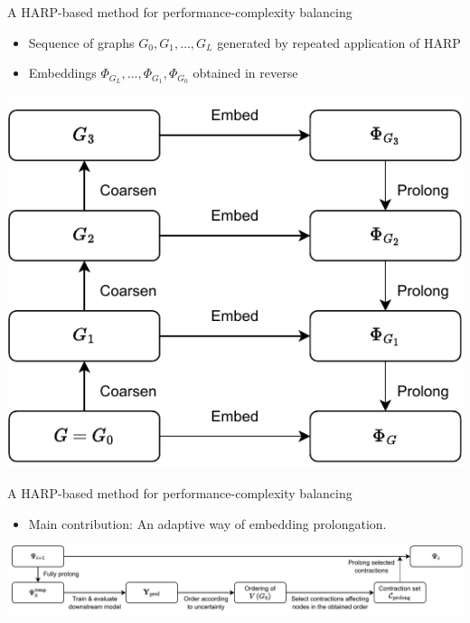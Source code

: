 \documentclass[10pt]{beamer}
\begin{document}
\begin{frame}{A HARP-based method for performance-complexity balancing}
	\begin{itemize}
		\item Sequence of graphs \( G_0, G_1, \dots, G_L \) generated by repeated application of HARP
		\item Embeddings \( \Phi_{G_L}, \dots, \Phi_{G_1}, \Phi_{G_0} \) obtained in reverse
	\end{itemize}

	\vfill

	\centering
	\includegraphics[width=0.5\linewidth]{images/deep-harp/deep-harp.pdf}
\end{frame}

\begin{frame}{A HARP-based method for performance-complexity balancing}
	\begin{itemize}
		\item Main contribution: An adaptive way of embedding prolongation.
	\end{itemize}

	\vfill

	\centering
	\includegraphics[width=\linewidth]{images/adaptive-prolongation/adaptive-prolongation.pdf}
\end{frame}
\end{document}
